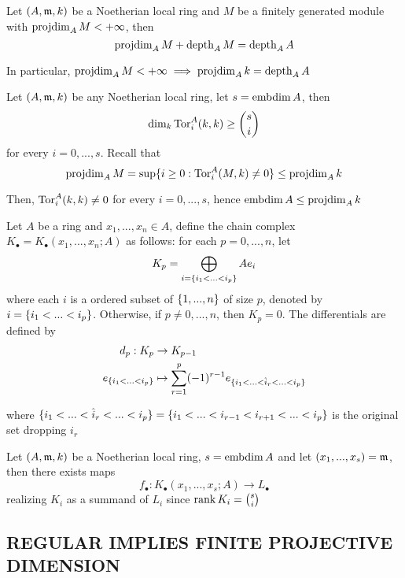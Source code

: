 \begin{theorem}
	Let $(A, \mathfrak{m}, k)$ be a Noetherian local ring and $M$ be a finitely generated module with $\operatorname{projdim}_A M < +\infty$, then 
	$$
		\operatorname{projdim}_A M + \operatorname{depth}_A M = \operatorname{depth}_A A
	$$
	
	In particular, $\operatorname{projdim}_A M < +\infty \implies \operatorname{projdim}_A k = \operatorname{depth}_A A$
\end{theorem}

\begin{proposition}
	Let $(A, \mathfrak{m}, k)$ be any Noetherian local ring, let $s = \operatorname{embdim} A$, then
	$$
		\dim_k \operatorname{Tor}_i^A(k, k) \geq {s \choose i}
	$$
	for every $i=0, ..., s$. Recall that 
	$$
		\operatorname{projdim}_A M = \sup\{i \geq 0: \operatorname{Tor}_i^A(M, k) \neq 0\} \leq \operatorname{projdim}_A k
	$$
	
	Then, $\operatorname{Tor}_i^A (k, k) \neq 0$ for every $i=0, ..., s$, hence $\operatorname{embdim} A \leq \operatorname{projdim}_A k$
\end{proposition}

\begin{definition}
	Let $A$ be a ring and $x_1, ..., x_n \in A$, define the chain complex $K_\bullet = K_\bullet(x_1, ..., x_n; A)$ as follows: for each $p=0, ..., n$, let 
	$$
		K_p = \bigoplus_{i = \{i_1 < ... < i_p\}} A e_i
	$$
	where each $i$ is a ordered subset of $\{1, ..., n\}$ of size $p$, denoted by $i = \{i_1 < ... < i_p\}$. Otherwise, if $p \neq 0, ..., n$, then $K_p = 0$. The differentials are defined by
	\begin{align*}
		d_p: K_p &\to K_{p-1} \\
		e_{\{i_1 < ... < i_p\}} &\mapsto \sum_{r=1}^p (-1)^{r-1} e_{\{i_1 < ... < \hat{i}_r < ... < i_p\}}
	\end{align*}
	
	where $\{i_1 < ... < \hat{i}_r < ... < i_p\} = \{i_1 < ... < i_{r-1} < i_{r+1} < ... < i_p\}$ is the original set dropping $i_r$
\end{definition}

\begin{remark}
	Let $(A, \mathfrak{m}, k)$ be a Noetherian local ring, $s = \operatorname{embdim} A$ and let $(x_1, ..., x_s) = \mathfrak{m}$, then there exists maps
	$$
		f_\bullet: K_\bullet(x_1, ..., x_s; A) \to L_\bullet
	$$
	realizing $K_i$ as a summand of $L_i$ since $\operatorname{rank} K_i = {s \choose i}$
\end{remark}

\subsection{REGULAR IMPLIES FINITE PROJECTIVE DIMENSION}

